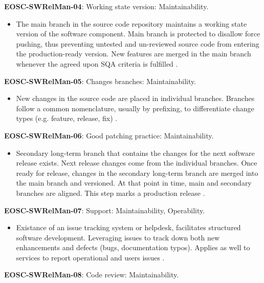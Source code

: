 \textbf{EOSC-SWRelMan-04}: Working state version: Maintainability.

\begin{itemize}
    \item The main branch in the source code repository maintains a working state version of the software component. Main branch is protected to disallow force pushing, thus preventing untested and un-reviewed source code from entering the production-ready version. New features are merged in the main branch whenever the agreed upon SQA criteria is fulfilled \cite{orviz_set_2017}.
\end{itemize}

\textbf{EOSC-SWRelMan-05}: Changes branches: Maintainability.

\begin{itemize}
    \item New changes in the source code are placed in individual branches. Branches follow a common nomenclature, usually by prefixing, to differentiate change types (e.g. feature, release, fix) \cite{orviz_set_2017}.
\end{itemize}

\textbf{EOSC-SWRelMan-06}: Good patching practice: Maintainability.

\begin{itemize}
    \item Secondary long-term branch that contains the changes for the next software release exists. Next release changes come from the individual branches. Once ready for release, changes in the secondary long-term branch are merged into the main branch and versioned. At that point in time, main and secondary branches are aligned. This step marks a production release \cite{orviz_set_2017,raymond_software_2013}.
\end{itemize}

\textbf{EOSC-SWRelMan-07}: Support: Maintainability, Operability.

\begin{itemize}
    \item Existance of an issue tracking system or helpdesk, facilitates structured software development. Leveraging issues to track down both new enhancements and defects (bugs, documentation typos). Applies as well to services to report operational and users issues \cite{srisopha_software_2018,shepherdson_cessda_2019,orviz_set_2017,orviz_fernandez_eosc-synergy_2020}.
\end{itemize}

\textbf{EOSC-SWRelMan-08}: Code review: Maintainability.

